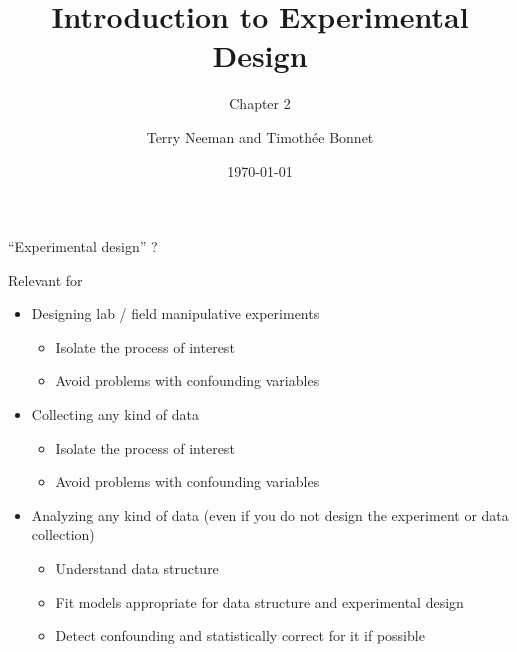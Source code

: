\documentclass{beamer}
\title{Introduction to Experimental Design}
\subtitle{Chapter 2}
\author{Terry Neeman and Timoth\'ee Bonnet}
\date{\today}
\begin{document}



\begin{frame}{}
\maketitle

\end{frame}

\begin{frame}{``Experimental design'' ?}
 
 \begin{exampleblock}{Relevant for}
  \begin{itemize}[<+->]
   \item Designing lab / field manipulative experiments
      \begin{itemize}
       \item Isolate the process of interest
       \item Avoid problems with confounding variables
      \end{itemize}
   \item Collecting any kind of data 
   \begin{itemize}
       \item Isolate the process of interest
       \item Avoid problems with confounding variables
      \end{itemize}
   \item Analyzing any kind of data (even if you do not design the experiment or data collection)
      \begin{itemize}
       \item Understand data structure
       \item Fit models appropriate for data structure and experimental design
       \item Detect confounding and statistically correct for it if possible
      \end{itemize}

  \end{itemize}  
 \end{exampleblock}

 
\end{frame}
\end{document}

